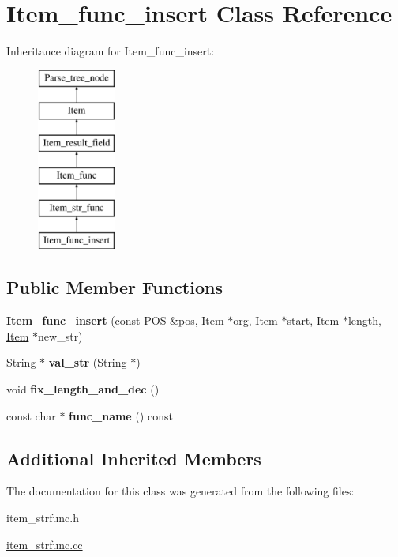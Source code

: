\hypertarget{classItem__func__insert}{}\section{Item\+\_\+func\+\_\+insert Class Reference}
\label{classItem__func__insert}
Inheritance diagram for Item\+\_\+func\+\_\+insert\+:\begin{figure}[H]
\begin{center}
\leavevmode
\includegraphics[height=6.000000cm]{classItem__func__insert}
\end{center}
\end{figure}
\subsection*{Public Member Functions}
\begin{DoxyCompactItemize}
\item 
\mbox{\label{classItem__func__insert_a930b2a0f8c37f15106cac4c4cf79d53f}} 
{\bfseries Item\+\_\+func\+\_\+insert} (const \mbox{\hyperlink{structYYLTYPE}{P\+OS}} \&pos, \mbox{\hyperlink{classItem}{Item}} $\ast$org, \mbox{\hyperlink{classItem}{Item}} $\ast$start, \mbox{\hyperlink{classItem}{Item}} $\ast$length, \mbox{\hyperlink{classItem}{Item}} $\ast$new\+\_\+str)
\item 
\mbox{\label{classItem__func__insert_aa051521647aa9751c8be2a3087f1a55d}} 
String $\ast$ {\bfseries val\+\_\+str} (String $\ast$)
\item 
\mbox{\label{classItem__func__insert_a0beb176198973daeaa6ab1df7d23ef17}} 
void {\bfseries fix\+\_\+length\+\_\+and\+\_\+dec} ()
\item 
\mbox{\label{classItem__func__insert_a4f8a492baea79d9d78b7915c921d9327}} 
const char $\ast$ {\bfseries func\+\_\+name} () const
\end{DoxyCompactItemize}
\subsection*{Additional Inherited Members}


The documentation for this class was generated from the following files\+:\begin{DoxyCompactItemize}
\item 
item\+\_\+strfunc.\+h\item 
\mbox{\hyperlink{item__strfunc_8cc}{item\+\_\+strfunc.\+cc}}\end{DoxyCompactItemize}
